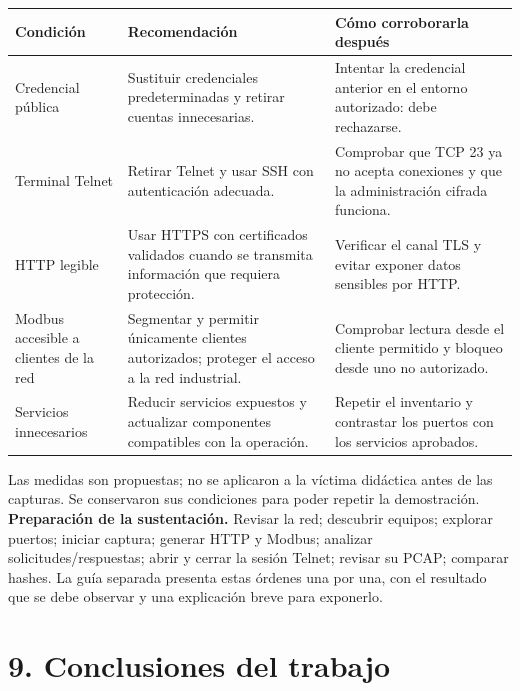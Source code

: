 \documentclass[11pt,a4paper]{article}
\begin{document}
\par\begin{tabularx}{\linewidth}{@{}P{3.2cm}YY@{}}\toprule
Condición & Recomendación & Cómo corroborarla después\\\midrule
Credencial pública & Sustituir credenciales predeterminadas y retirar cuentas innecesarias. & Intentar la credencial anterior en el entorno autorizado: debe rechazarse.\\
Terminal Telnet & Retirar Telnet y usar SSH con autenticación adecuada. & Comprobar que TCP 23 ya no acepta conexiones y que la administración cifrada funciona.\\
HTTP legible & Usar HTTPS con certificados validados cuando se transmita información que requiera protección. & Verificar el canal TLS y evitar exponer datos sensibles por HTTP.\\
Modbus accesible a clientes de la red & Segmentar y permitir únicamente clientes autorizados; proteger el acceso a la red industrial. & Comprobar lectura desde el cliente permitido y bloqueo desde uno no autorizado.\\
Servicios innecesarios & Reducir servicios expuestos y actualizar componentes compatibles con la operación. & Repetir el inventario y contrastar los puertos con los servicios aprobados.\\\bottomrule
\end{tabularx}
Las medidas son propuestas; no se aplicaron a la víctima didáctica antes de las capturas. Se conservaron sus condiciones para poder repetir la demostración.
\textbf{Preparación de la sustentación.} Revisar la red; descubrir equipos; explorar puertos; iniciar captura; generar HTTP y Modbus; analizar solicitudes/respuestas; abrir y cerrar la sesión Telnet; revisar su PCAP; comparar hashes. La guía separada presenta estas órdenes una por una, con el resultado que se debe observar y una explicación breve para exponerlo.

\clearpage\section*{9. Conclusiones del trabajo}\label{conclusiones}
\end{document}
